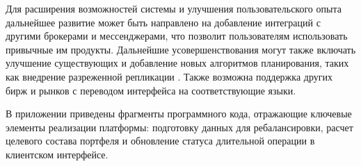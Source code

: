 \documentclass[14pt]{gost-7-32}
\begin{document}
Для расширения возможностей системы и улучшения пользовательского опыта дальнейшее развитие может быть направлено на добавление интеграций с другими брокерами и мессенджерами, что позволит пользователям использовать привычные им продукты. Дальнейшие усовершенствования могут также включать улучшение существующих и добавление новых алгоритмов планирования, таких как внедрение разреженной репликации \cite{benidisIndexTracking2018}. Также возможна поддержка других бирж и рынков с переводом интерфейса на соответствующие языки.

\newpage
{}
\nocite{schwabDirectIndexing,fidelityDirectIndexingOverview,wealthfrontInvesting,fidelityBasketFaq,m1PieWhatIs,rfc5545iCalendar}



\newpage
{}

В приложении приведены фрагменты программного кода, отражающие ключевые элементы реализации платформы: подготовку данных для ребалансировки, расчет целевого состава портфеля и обновление статуса длительной операции в клиентском интерфейсе.
\end{document}
